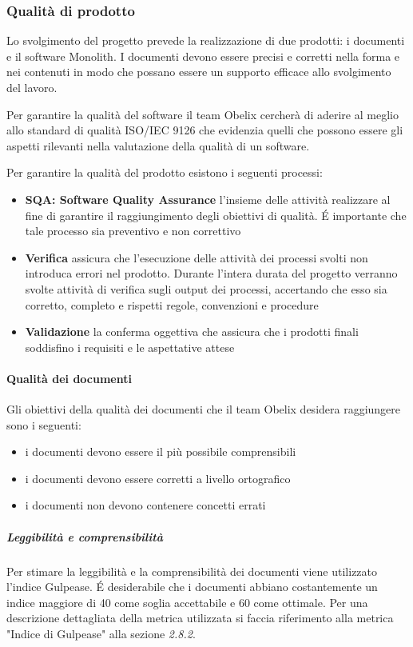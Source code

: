 \subsubsection{Qualità di prodotto}
Lo svolgimento del progetto prevede la realizzazione di due prodotti:
i documenti e il software Monolith.
I documenti devono essere precisi e corretti nella forma e nei
contenuti in modo che possano essere un supporto efficace allo
svolgimento del lavoro.

Per garantire la qualità del software il team Obelix cercherà
di aderire al meglio allo standard di qualità ISO/IEC 9126 che
evidenzia quelli che possono essere gli aspetti rilevanti nella
valutazione della qualità di un software.

Per garantire la qualità del prodotto esistono i seguenti processi:
\begin{itemize}
\item \textbf{SQA: Software Quality Assurance} l'insieme delle
  attività realizzare al fine di garantire il raggiungimento degli
  obiettivi di qualità. \'E importante che tale processo sia
  preventivo e non correttivo
\item \textbf{Verifica} assicura che l'esecuzione delle attività dei
  processi svolti non introduca errori
  nel prodotto. Durante l'intera durata del progetto verranno svolte
  attività di verifica sugli
  output dei processi, accertando che esso sia corretto, completo e
  rispetti regole, convenzioni
  e procedure
\item \textbf{Validazione} la conferma oggettiva che assicura che i prodotti finali soddisfino i requisiti
  e le aspettative attese
\end{itemize}

\paragraph{Qualità dei documenti}
Gli obiettivi della qualità dei documenti che il team Obelix desidera raggiungere sono i seguenti:
\begin{itemize}
\item i documenti devono essere il più possibile comprensibili
\item i documenti devono essere corretti a livello ortografico
\item i documenti non devono contenere concetti errati
\end{itemize}

\subparagraph{Leggibilità e comprensibilità}
Per stimare la leggibilità e la comprensibilità dei documenti
viene utilizzato l'indice Gulpease. \'E desiderabile che i documenti
abbiano costantemente un indice maggiore
di 40 come soglia accettabile e 60 come ottimale. Per una descrizione
dettagliata della metrica utilizzata si faccia riferimento
alla metrica "Indice di Gulpease" alla sezione
\emph{2.8.2}. %




